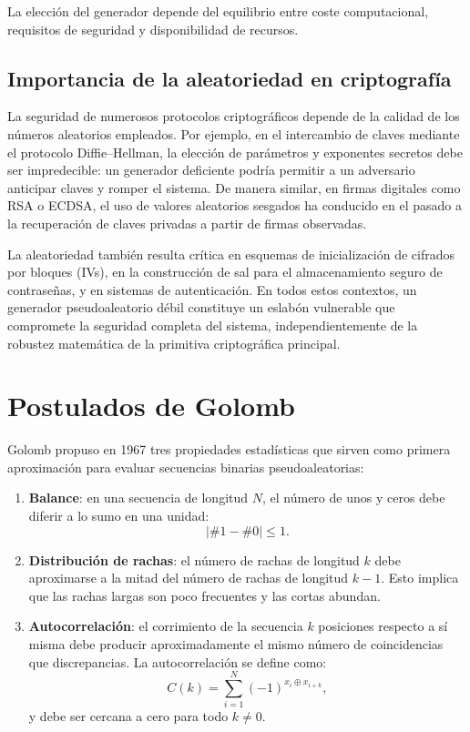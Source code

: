 La elección del generador depende del equilibrio entre coste computacional,
requisitos de seguridad y disponibilidad de recursos.

\subsection*{Importancia de la aleatoriedad en criptografía}

La seguridad de numerosos protocolos criptográficos depende de la calidad de los
números aleatorios empleados. Por ejemplo, en el intercambio de claves mediante
el protocolo Diffie–Hellman, la elección de parámetros y exponentes secretos debe
ser impredecible: un generador deficiente podría permitir a un adversario
anticipar claves y romper el sistema. De manera similar, en firmas digitales como
RSA o ECDSA, el uso de valores aleatorios sesgados ha conducido en el pasado a la
recuperación de claves privadas a partir de firmas observadas.

La aleatoriedad también resulta crítica en esquemas de inicialización de cifrados
por bloques (IVs), en la construcción de sal para el almacenamiento seguro de
contraseñas, y en sistemas de autenticación. En todos estos contextos, un
generador pseudoaleatorio débil constituye un eslabón vulnerable que compromete la
seguridad completa del sistema, independientemente de la robustez matemática de la
primitiva criptográfica principal.


\section*{Postulados de Golomb}

Golomb propuso en 1967 tres propiedades estadísticas que sirven como primera
aproximación para evaluar secuencias binarias pseudoaleatorias:

\begin{enumerate}
    \item \textbf{Balance}: en una secuencia de longitud $N$, el número de unos
    y ceros debe diferir a lo sumo en una unidad:
    \[
    \left| \#1 - \#0 \right| \leq 1.
    \]

    \item \textbf{Distribución de rachas}: el número de rachas de longitud $k$
    debe aproximarse a la mitad del número de rachas de longitud $k-1$. Esto
    implica que las rachas largas son poco frecuentes y las cortas abundan.

    \item \textbf{Autocorrelación}: el corrimiento de la secuencia $k$ posiciones
    respecto a sí misma debe producir aproximadamente el mismo número de
    coincidencias que discrepancias. La autocorrelación se define como:
    \[
    C(k) = \sum_{i=1}^{N} (-1)^{x_i \oplus x_{i+k}},
    \]
    y debe ser cercana a cero para todo $k \neq 0$.
\end{enumerate}

